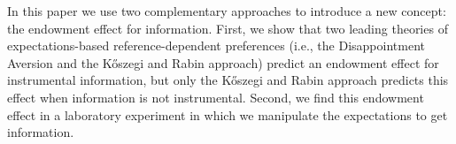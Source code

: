 

In this paper we use two complementary approaches to introduce a new concept: the endowment effect for information. First, we show that two leading theories of expectations-based reference-dependent preferences (i.e., the Disappointment Aversion and the Kőszegi and Rabin approach) predict an endowment effect for instrumental information, but only the Kőszegi and Rabin approach predicts this effect when information is not instrumental. Second, we find this endowment effect in a laboratory experiment in which we manipulate the expectations to get information.

